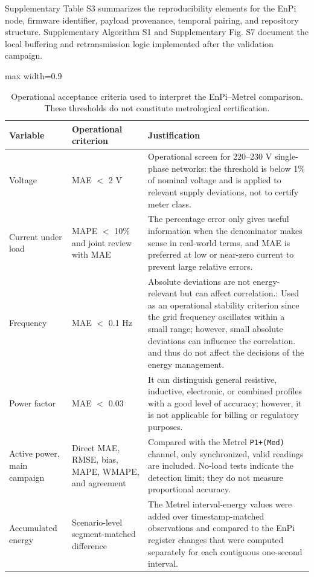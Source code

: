 \documentclass[technologies,article,submit,pdftex,moreauthors]{Definitions/mdpi}
\begin{document}
Supplementary Table S3 summarizes the reproducibility elements for the EnPi node, firmware identifier, payload provenance, temporal pairing, and repository structure. Supplementary Algorithm S1 and Supplementary Fig. S7 document the local buffering and retransmission logic implemented after the validation campaign.

\begin{table}
\caption{Operational acceptance criteria used to interpret the EnPi--Metrel comparison. These thresholds do not constitute metrological certification.}
\label{tab:criterios-operacionales}
\centering
\scriptsize
\begin{adjustbox}{max width=0.9\columnwidth}
\begin{tabular}{p{}p{}p{}}
\toprule
Variable & Operational criterion & Justification \\
\midrule
Voltage & MAE $<$ 2 V & Operational screen for 220--230 V single-phase networks: the threshold is below 1\% of nominal voltage and is applied to relevant supply deviations, not to certify meter class.  \\
Current under load & MAPE $<$ 10\% and joint review with MAE & The percentage error only gives useful information when the denominator makes sense in real-world terms, and MAE is preferred at low or near-zero current to prevent large relative errors. \\
Frequency & MAE $<$ 0.1 Hz & Absolute deviations are not energy-relevant but can affect correlation.: Used as an operational stability criterion since the grid frequency oscillates within a small range; however, small absolute deviations can influence the correlation. and thus do not affect the decisions of the energy management. \\
Power factor & MAE $<$ 0.03 & It can distinguish general resistive, inductive, electronic, or combined profiles with a good level of accuracy; however, it is not applicable for billing or regulatory purposes.  \\
Active power, main campaign & Direct MAE, RMSE, bias, MAPE, WMAPE, and agreement & Compared with the Metrel \texttt{P1+(Med)} channel, only synchronized, valid readings are included. No-load tests indicate the detection limit; they do not measure proportional accuracy.\\
Accumulated energy & Scenario-level segment-matched difference & The Metrel interval-energy values were added over timestamp-matched observations and compared to the EnPi register changes that were computed separately for each contiguous one-second interval.
\\
\bottomrule
\end{tabular}
\end{adjustbox}
\end{table}
\end{document}
